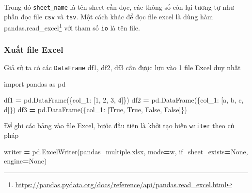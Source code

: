 \documentclass[
]{book}
\newenvironment{Shaded}{\begin{snugshade}}{\end{snugshade}}
\newcommand{\DecValTok}[1]{\textcolor[rgb]{0.00,0.00,0.81}{#1}}
\newcommand{\ImportTok}[1]{#1}
\newcommand{\NormalTok}[1]{#1}
\newcommand{\OperatorTok}[1]{\textcolor[rgb]{0.81,0.36,0.00}{\textbf{#1}}}
\newcommand{\StringTok}[1]{\textcolor[rgb]{0.31,0.60,0.02}{#1}}
\newcommand{\VariableTok}[1]{\textcolor[rgb]{0.00,0.00,0.00}{#1}}
\renewcommand{\href}[2]{#2\footnote{\url{#1}}}
\begin{document}
Trong đó \texttt{sheet\_name} là tên sheet cần đọc, các thông số còn lại tương tự như phần đọc file \texttt{csv} và \texttt{tsv}. Một cách khác để đọc file excel là dùng hàm \href{https://pandas.pydata.org/docs/reference/api/pandas.read_excel.html}{pandas.read\_excel} với tham số \texttt{io} là tên file.

\subsubsection{Xuất file Excel}\label{xuux1ea5t-file-excel}

Giả sử ta có các \texttt{DataFrame} df1, df2, df3 cần được lưu vào 1 file Excel duy nhất

\begin{Shaded}
\begin{Highlighting}[]
\ImportTok{import}\NormalTok{ pandas }\ImportTok{as}\NormalTok{ pd}

\NormalTok{df1 }\OperatorTok{=}\NormalTok{ pd.DataFrame(\{}\StringTok{\textquotesingle{}col\_1\textquotesingle{}}\NormalTok{: [}\DecValTok{1}\NormalTok{, }\DecValTok{2}\NormalTok{, }\DecValTok{3}\NormalTok{, }\DecValTok{4}\NormalTok{]\})}
\NormalTok{df2 }\OperatorTok{=}\NormalTok{ pd.DataFrame(\{}\StringTok{\textquotesingle{}col\_1\textquotesingle{}}\NormalTok{: [}\StringTok{\textquotesingle{}a\textquotesingle{}}\NormalTok{, }\StringTok{\textquotesingle{}b\textquotesingle{}}\NormalTok{, }\StringTok{\textquotesingle{}c\textquotesingle{}}\NormalTok{, }\StringTok{\textquotesingle{}d\textquotesingle{}}\NormalTok{]\})}
\NormalTok{df3 }\OperatorTok{=}\NormalTok{ pd.DataFrame(\{}\StringTok{\textquotesingle{}col\_1\textquotesingle{}}\NormalTok{: [}\VariableTok{True}\NormalTok{, }\VariableTok{True}\NormalTok{, }\VariableTok{False}\NormalTok{, }\VariableTok{False}\NormalTok{]\})}
\end{Highlighting}
\end{Shaded}

Để ghi các bảng vào file Excel, bước đầu tiên là khởi tạo biến \texttt{writer} theo cú pháp

\begin{Shaded}
\begin{Highlighting}[]
\NormalTok{writer }\OperatorTok{=}\NormalTok{ pd.ExcelWriter(}\StringTok{\textquotesingle{}pandas\_multiple.xlsx\textquotesingle{}}\NormalTok{, mode}\OperatorTok{=}\StringTok{\textquotesingle{}w\textquotesingle{}}\NormalTok{,  if\_sheet\_exists}\OperatorTok{=}\VariableTok{None}\NormalTok{, engine}\OperatorTok{=}\VariableTok{None}\NormalTok{)}
\end{Highlighting}
\end{Shaded}
\end{document}
